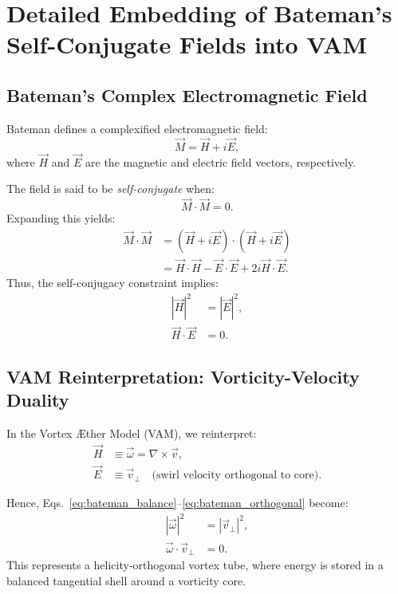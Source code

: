 \section{Detailed Embedding of Bateman's Self-Conjugate Fields into VAM}
\label{appendix:bateman_vam}

\subsection{Bateman's Complex Electromagnetic Field}

Bateman defines a complexified electromagnetic field:\cite{bateman1915aether}
\begin{equation}
    \vec{M} = \vec{H} + i\vec{E},
\end{equation}
where $\vec{H}$ and $\vec{E}$ are the magnetic and electric field vectors, respectively.

The field is said to be \textit{self-conjugate} when:
\begin{equation}
    \vec{M} \cdot \vec{M} = 0. \label{eq:bateman_self_conj}
\end{equation}
Expanding this yields:\cite{bateman1915aether}
\begin{align}
    \vec{M} \cdot \vec{M} &= (\vec{H} + i\vec{E}) \cdot (\vec{H} + i\vec{E}) \\
    &= \vec{H} \cdot \vec{H} - \vec{E} \cdot \vec{E} + 2i \vec{H} \cdot \vec{E}.
\end{align}
Thus, the self-conjugacy constraint implies:
\begin{align}
    |\vec{H}|^2 &= |\vec{E}|^2, \label{eq:bateman_balance} \\
    \vec{H} \cdot \vec{E} &= 0. \label{eq:bateman_orthogonal}
\end{align}

\subsection{VAM Reinterpretation: Vorticity-Velocity Duality}

In the Vortex Æther Model (VAM), we reinterpret:\cite{iskandarani2025swirlgravity}
\begin{align*}
    \vec{H} &\equiv \vec{\omega} = \nabla \times \vec{v}, \\
    \vec{E} &\equiv \vec{v}_\perp \quad \text{(swirl velocity orthogonal to core)}.
\end{align*}

Hence, Eqs.~\eqref{eq:bateman_balance}--\eqref{eq:bateman_orthogonal} become:
\begin{align}
    |\vec{\omega}|^2 &= |\vec{v}_\perp|^2, \label{eq:vam_balance} \\
    \vec{\omega} \cdot \vec{v}_\perp &= 0. \label{eq:vam_orthogonal}
\end{align}
This represents a helicity-orthogonal vortex tube, where energy is stored in a balanced tangential shell around a vorticity core.

